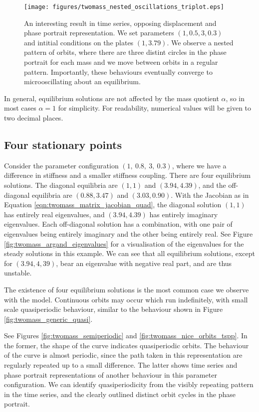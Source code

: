 \begin{figure}[h!]
    \centering
    \texttt{[image: figures/twomass\_nested\_oscillations\_triplot.eps]}
    \caption{
        An interesting result in time series, opposing displacement and phase portrait representation.
        We set parameters \((1,0.5,3,0.3)\) and intitial conditions on the plates \((1,3.79)\).
        We observe a nested pattern of orbits,
        where there are three distint circles in the phase portrait for each mass and we move between orbits in a regular pattern.
        Importantly, these behaviours eventually converge to microoscillating about an equilibrium.
    }
    \label{fig:twomass_nested_interesting_1}
\end{figure}

In general, equilibrium solutions are not affected by the mass quotient $\alpha$, so in most cases $\alpha = 1$ for simplicity.
For readability, numerical values will be given to two decimal places.

\subsection{Four stationary points}

Consider the parameter configuration \((1,~0.8,~3,~0.3)\), where we have a difference in stiffness and a smaller stiffness coupling.
There are four equilibrium solutions.
The diagonal equilibria are \((1,1)\) and \((3.94,4.39)\),
and the off-diagonal equilibria are \((0.88,3.47)\) and \((3.03,0.90)\).
With the Jacobian as in Equation \ref{eqn:twomass_matrix_jacobian_quad},
the diagonal solution \((1,1)\) has entirely real eigenvalues, and \((3.94,4.39)\) has entirely imaginary eigenvalues.
Each off-diagonal solution has a combination, with one pair of eigenvalues being entirely imaginary and the other being entirely real.
See Figure \ref{fig:twomass_argand_eigenvalues} for a visualisation of the eigenvalues for the steady solutions in this example.
We can see that all equilibrium solutions, except for \((3.94,4,39)\), bear an eigenvalue with negative real part, and are thus unstable.  %

The existence of four equilibrium solutions is the most common case we observe with the model.
Continuous orbits may occur which run indefinitely, with small scale quasiperiodic behaviour,
similar to the behaviour shown in Figure \ref{fig:twomass_generic_quasi}.

See Figures \ref{fig:twomass_semiperiodic} and \ref{fig:twomass_nice_orbits_tspp}.
In the former, the shape of the curve indicates quasiperiodic orbits.
The behaviour of the curve is almost periodic, since the path taken in this representation are regularly repeated up to a small difference.
The latter shows time series and phase portrait representations of another behaviour in this parameter configuration.
We can identify quasiperiodicity from the visibly repeating pattern in the time series,
and the clearly outlined distinct orbit cycles in the phase portrait.


